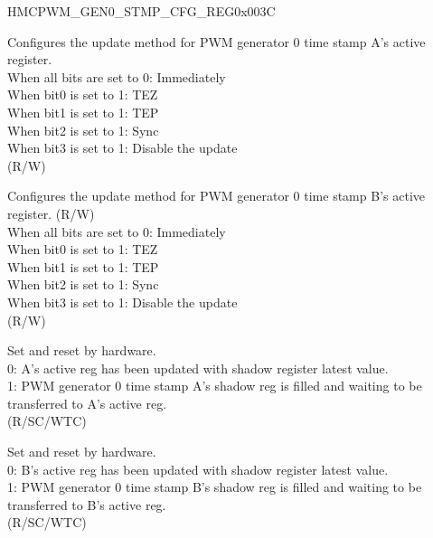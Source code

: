\begin{register}{H}{MCPWM\_GEN0\_STMP\_CFG\_REG}{0x003C}\label{regdesc:MCPWMGEN0STMPCFGREG}
%
%
%
%
%
\regnewline%
\begin{regdesc}\begin{reglist}
\label{fielddesc:MCPWMGEN0AUPMETHOD}\item [MCPWM\_GEN0\_A\_UPMETHOD] Configures the update method for PWM generator 0 time stamp A's active register. 
\\When all bits are set to 0: Immediately
\\When bit0 is set to 1: TEZ 
\\When bit1 is set to 1: TEP 
\\When bit2 is set to 1: Sync
\\When bit3 is set to 1: Disable the update 
\\(R/W)
\label{fielddesc:MCPWMGEN0BUPMETHOD}\item [MCPWM\_GEN0\_B\_UPMETHOD] Configures the update method for PWM generator 0 time stamp B's active register. (R/W)
\\When all bits are set to 0: Immediately
\\When bit0 is set to 1: TEZ 
\\When bit1 is set to 1: TEP
\\When bit2 is set to 1: Sync 
\\When bit3 is set to 1: Disable the update
\\(R/W)
\label{fielddesc:MCPWMGEN0ASHDWFULL}\item [MCPWM\_GEN0\_A\_SHDW\_FULL] Set and reset by hardware. \\
0: A's active reg has been updated with shadow register latest value. \\
1: PWM generator 0 time stamp A's shadow reg is filled and waiting to be transferred to A's active reg. \\
(R/SC/WTC) 
\label{fielddesc:MCPWMGEN0BSHDWFULL}\item [MCPWM\_GEN0\_B\_SHDW\_FULL] Set and reset by hardware.\\
0: B's active reg has been updated with shadow register latest value.\\
1: PWM generator 0 time stamp B's shadow reg is filled and waiting to be transferred to B's active reg. \\
(R/SC/WTC) 
\end{reglist}\end{regdesc}
\end{register}


